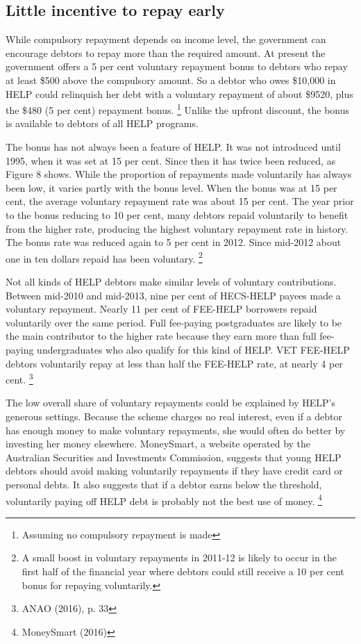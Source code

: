 \documentclass[embargoed]{grattan}
\begin{document}
\subsection{Little incentive to repay early}\label{little-incentive-to-repay-early}

While compulsory repayment depends on income level, the government can encourage debtors to repay more than the required amount.
At present the government offers a 5 per cent voluntary repayment bonus to debtors who repay at least \$500 above the compulsory amount.
So a debtor who owes \$10,000 in HELP could relinquish her debt with a voluntary repayment of about \$9520, plus the \$480 (5 per cent) repayment bonus.%
\footnote{Assuming no compulsory repayment is made} Unlike the upfront discount, the bonus is available to debtors of all HELP programs.

The bonus has not always been a feature of HELP.
It was not introduced until 1995, when it was set at 15 per cent.
Since then it has twice been reduced, as Figure 8 shows.
While the proportion of repayments made voluntarily has always been low, it varies partly with the bonus level.
When the bonus was at 15 per cent, the average voluntary repayment rate was about 15 per cent.
The year prior to the bonus reducing to 10 per cent, many debtors repaid voluntarily to benefit from the higher rate, producing the highest voluntary repayment rate in history.
The bonus rate was reduced again to 5 per cent in 2012.
Since mid-2012 about one in ten dollars repaid has been voluntary.%
\footnote{A small boost in voluntary repayments in 2011-12 is likely to occur in the first half of the financial year where debtors could still receive a 10 per cent bonus for repaying voluntarily.}

Not all kinds of HELP debtors make similar levels of voluntary contributions.
Between mid-2010 and mid-2013, nine per cent of HECS-HELP payees made a voluntary repayment.
Nearly 11 per cent of FEE-HELP borrowers repaid voluntarily over the same period.
Full fee-paying postgraduates are likely to be the main contributor to the higher rate because they earn more than full fee-paying undergraduates who also qualify for this kind of HELP.
VET FEE-HELP debtors voluntarily repay at less than half the FEE-HELP rate, at nearly 4 per cent.%
\footnote{ANAO (2016), p. 33}

The low overall share of voluntary repayments could be explained by HELP's generous settings.
Because the scheme charges no real interest, even if a debtor has enough money to make voluntary repayments, she would often do better by investing her money elsewhere.
MoneySmart, a website operated by the Australian Securities and Investments Commission, suggests that young HELP debtors should avoid making voluntarily repayments if they have credit card or personal debts.
It also suggests that if a debtor earns below the threshold, voluntarily paying off HELP debt is probably not the best use of money.%
\footnote{MoneySmart (2016)}
\end{document}

